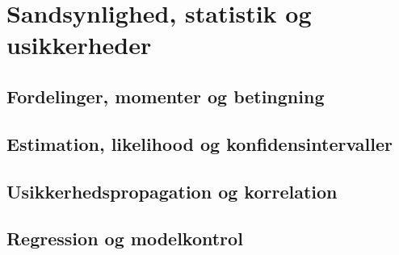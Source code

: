 \chapter{Sandsynlighed, statistik og usikkerheder}
\section{Fordelinger, momenter og betingning}
\leavevmode\par

\section{Estimation, likelihood og konfidensintervaller}
\leavevmode\par

\section{Usikkerhedspropagation og korrelation}
\leavevmode\par

\section{Regression og modelkontrol}
\leavevmode\par

